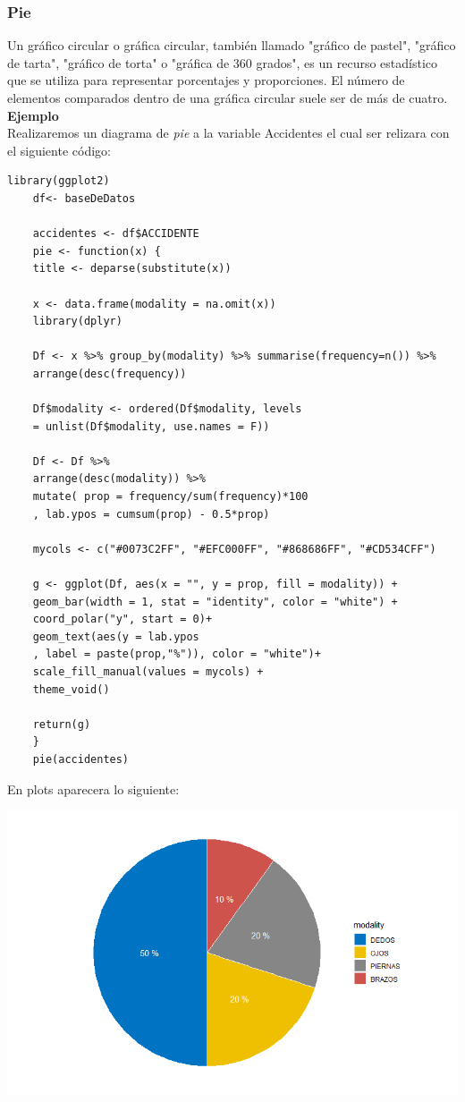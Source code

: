 \documentclass[12pt,hidelinks]{article}
\begin{document}
	\subsubsection{Pie}
	Un gráfico circular o gráfica circular, también llamado "gráfico de pastel", "gráfico de tarta", "gráfico de torta" o "gráfica de 360 grados", es un recurso estadístico que se utiliza para representar porcentajes y proporciones. El número de elementos comparados dentro de una gráfica circular suele ser de más de cuatro.\newpage
	\textbf{Ejemplo}\\
	Realizaremos un diagrama de \textit{pie} a la variable Accidentes el cual ser relizara con el siguiente código:
	\begin{lstlisting}[frame=single]
	library(ggplot2)
	df<- baseDeDatos
	
	accidentes <- df$ACCIDENTE
	pie <- function(x) {
	title <- deparse(substitute(x))
	
	x <- data.frame(modality = na.omit(x))
	library(dplyr)
	
	Df <- x %>% group_by(modality) %>% summarise(frequency=n()) %>%
	arrange(desc(frequency))
	
	Df$modality <- ordered(Df$modality, levels 
	= unlist(Df$modality, use.names = F))
	
	Df <- Df %>%
	arrange(desc(modality)) %>%
	mutate( prop = frequency/sum(frequency)*100 
	, lab.ypos = cumsum(prop) - 0.5*prop)
	
	mycols <- c("#0073C2FF", "#EFC000FF", "#868686FF", "#CD534CFF")
	
	g <- ggplot(Df, aes(x = "", y = prop, fill = modality)) +
	geom_bar(width = 1, stat = "identity", color = "white") +
	coord_polar("y", start = 0)+
	geom_text(aes(y = lab.ypos
	, label = paste(prop,"%")), color = "white")+
	scale_fill_manual(values = mycols) +
	theme_void()
	
	return(g)
	}
	pie(accidentes)
	\end{lstlisting}
	En plots aparecera lo siguiente:
	\begin{center}
		\includegraphics[width = 14cm]{GC.png}
	\end{center}
	
\end{document}
